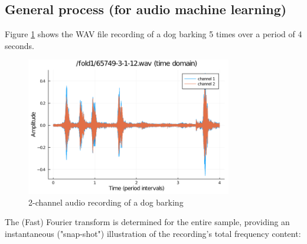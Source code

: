 \documentclass[a4paper,12pt]{article}
\numberwithin{equation}{section}
\numberwithin{figure}{section}
\numberwithin{table}{section}
\begin{document}
\subsection{General process (for audio machine learning)}
Figure \ref{wav_example} shows the WAV file recording of a dog barking 5 times over a period of 4 seconds.

\begin{figure}[h!]
    \centering %
    \includegraphics[padding=1ex,width=0.8\textwidth,frame]{img/wav_example.png}
    \caption{2-channel audio recording of a dog barking}
    \label{wav_example}
\end{figure}





\newpage

The (Fast) Fourier transform is determined for the entire sample, providing an instantaneous ("snap-shot") illustration of the recording's total frequency content:
\end{document}
